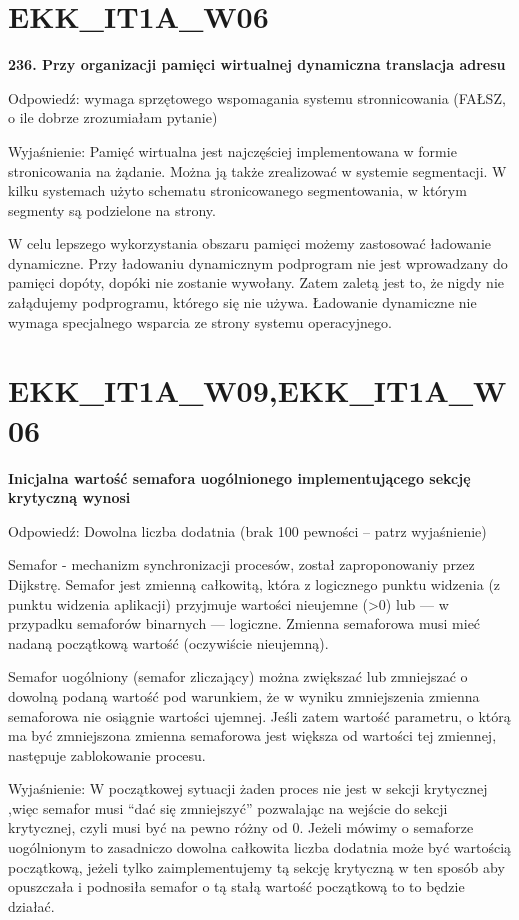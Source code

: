 \section{EKK\_IT1A\_W06}
\textbf{236. Przy organizacji pamięci wirtualnej dynamiczna translacja adresu}

\vspace{0.4cm}

Odpowiedź: wymaga sprzętowego wspomagania systemu stronnicowania (FAŁSZ, o ile dobrze zrozumiałam pytanie)

Wyjaśnienie:  Pamięć wirtualna jest najczęściej implementowana w formie stronicowania na żądanie.  Można ją także zrealizować w systemie segmentacji.
 W kilku systemach użyto schematu stronicowanego segmentowania, w którym segmenty są podzielone na strony.

 W celu lepszego wykorzystania obszaru pamięci możemy zastosować ładowanie dynamiczne.
 Przy ładowaniu dynamicznym podprogram nie jest wprowadzany do pamięci dopóty, dopóki nie zostanie wywołany.
 Zatem zaletą jest to, że nigdy nie załądujemy podprogramu, którego się nie używa.
Ładowanie dynamiczne nie wymaga specjalnego wsparcia ze strony systemu operacyjnego.


\section{EKK\_IT1A\_W09,EKK\_IT1A\_W06}
\textbf{Inicjalna wartość semafora uogólnionego implementującego sekcję krytyczną wynosi}

\vspace{0.4cm}

Odpowiedź: Dowolna liczba dodatnia (brak 100 pewności -- patrz wyjaśnienie)

Semafor - mechanizm synchronizacji procesów, został zaproponowaniy przez Dijkstrę.
Semafor jest zmienną całkowitą, która z logicznego punktu widzenia (z punktu widzenia aplikacji) przyjmuje wartości nieujemne (>0) lub — w przypadku semaforów binarnych — logiczne. Zmienna semaforowa musi mieć nadaną początkową wartość (oczywiście nieujemną).

Semafor uogólniony (semafor zliczający) można zwiększać lub zmniejszać o dowolną podaną wartość pod warunkiem, że w wyniku zmniejszenia zmienna semaforowa nie osiągnie wartości ujemnej. Jeśli zatem wartość parametru, o którą ma być zmniejszona zmienna semaforowa jest większa od wartości tej zmiennej, następuje zablokowanie procesu.

Wyjaśnienie: W początkowej sytuacji żaden proces nie jest w sekcji krytycznej ,więc semafor musi “dać się zmniejszyć” pozwalając na wejście do sekcji krytycznej, czyli musi być na pewno różny od 0. Jeżeli mówimy o semaforze uogólnionym to zasadniczo dowolna całkowita liczba dodatnia może być wartością początkową, jeżeli tylko zaimplementujemy tą sekcję krytyczną w ten sposób aby opuszczała i podnosiła semafor o tą stałą wartość początkową to to będzie działać.


